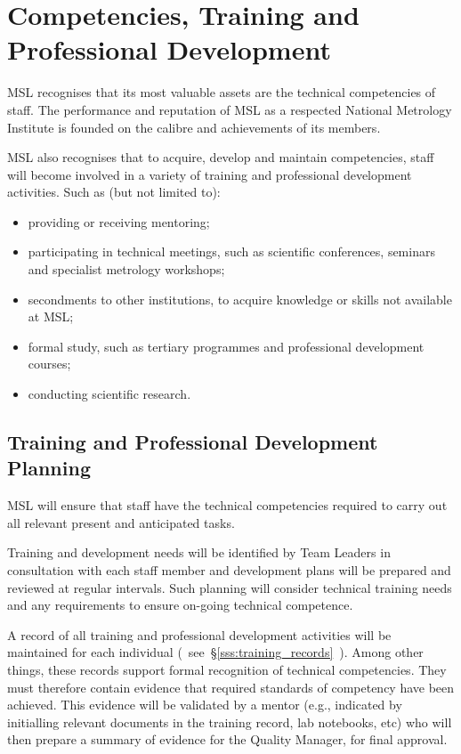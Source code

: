 \section{Competencies, Training and Professional Development}
\label{s:competencies_professional_development}
MSL recognises that its most valuable assets are the technical competencies of staff.  The performance and reputation of MSL as a respected National Metrology Institute is founded on the calibre and achievements of its members. 

MSL also recognises that to acquire, develop and maintain competencies, staff will become involved in a variety of training and professional development activities. Such as (but not limited to):
\begin{itemize}
\item providing or receiving mentoring;
\item participating in technical meetings, such as scientific conferences, seminars and specialist metrology workshops;
\item secondments to other institutions, to acquire knowledge or skills not available at MSL;
\item formal study, such as tertiary programmes and professional development courses;
\item conducting scientific research.
\end{itemize}
\subsection{Training and Professional Development Planning}
MSL will ensure that staff have the technical competencies required to carry out all relevant present and anticipated tasks. 

Training and development needs will be identified by Team Leaders in consultation with each staff member and development plans will be prepared and reviewed at regular intervals. Such planning will consider technical training needs and any requirements to ensure on-going technical competence. 

A record of all training and professional development activities will be maintained for each individual (~see~\S\ref{sss:training_records}~). Among other things, these records support formal recognition of technical competencies. They must therefore contain evidence that required standards of competency have been achieved. This evidence will be validated by a mentor (e.g., indicated by initialling relevant documents in the training record, lab notebooks, etc) who will then prepare a summary of evidence for the Quality Manager, for final approval.

